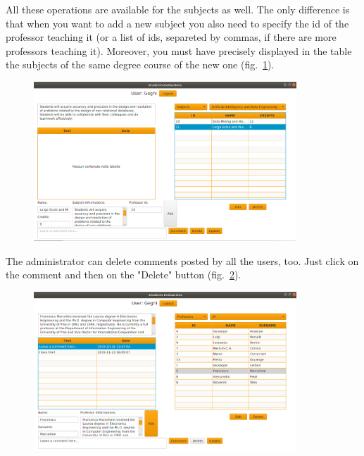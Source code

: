 \documentclass[a4paper, oneside]{article}
\begin{document}
All these operations are available for the subjects as well. The only difference is that when you want to add a new subject you also need to specify the id of the professor teaching it (or a list of ids, separeted by commas, if there are more professors teaching it). Moreover, you must have precisely displayed in the table the subjects of the same degree course of the new one (fig.~\ref{fig:admin3}).
\begin{figure}[h]
\centering
\includegraphics[width=0.88\textwidth]{images/screens/admin3}
\label{fig:admin3}
\end{figure}
\clearpage
The administrator can delete comments posted by all the users, too. Just click on the comment and then on the "Delete" button (fig.~\ref{fig:admin4}).
\begin{figure}[h]
\centering
\includegraphics[width=0.88\textwidth]{images/screens/admin4}
\label{fig:admin4}
\end{figure}

\fi
\end{document}
